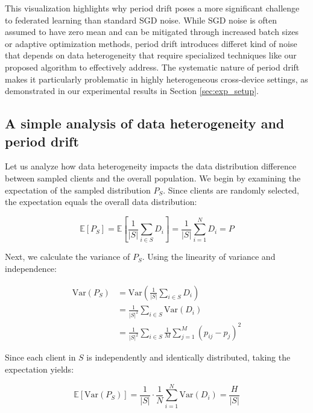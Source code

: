 This visualization highlights why period drift poses a more significant challenge to federated learning than standard SGD noise. While SGD noise is often assumed to have zero mean and can be mitigated through increased batch sizes or adaptive optimization methods, period drift introduces differet kind of noise that depends on data heterogeneity that require specialized techniques like our proposed \fedeve algorithm to effectively address. The systematic nature of period drift makes it particularly problematic in highly heterogeneous cross-device settings, as demonstrated in our experimental results in Section \ref{sec:exp_setup}.

\subsection{A simple analysis of data heterogeneity and period drift}
Let us analyze how data heterogeneity impacts the data distribution difference between sampled clients and the overall population. We begin by examining the expectation of the sampled distribution $P_S$. Since clients are randomly selected, the expectation equals the overall data distribution:

\begin{equation}
    \mathbb{E}[P_S] = \mathbb{E}\left[ \frac{1}{|S|} \sum_{i \in S} D_i \right] = \frac{1}{|S|} \sum_{i=1}^{N} D_i = P
\end{equation}

Next, we calculate the variance of $P_S$. Using the linearity of variance and independence:

\begin{equation}
    \begin{aligned}
        \text{Var}(P_S) &= \text{Var}\left( \frac{1}{|S|} \sum_{i \in S} D_i \right) \\
        &= \frac{1}{|S|^2} \sum_{i \in S} \text{Var}(D_i) \\
        &= \frac{1}{|S|^2} \sum_{i \in S} \frac{1}{M} \sum_{j=1}^{M} (p_{ij} - p_j)^2
    \end{aligned}
\end{equation}

Since each client in $S$ is independently and identically distributed, taking the expectation yields:

\begin{equation}
    \mathbb{E}[\text{Var}(P_S)] = \frac{1}{|S|} \cdot \frac{1}{N} \sum_{i=1}^N \text{Var}(D_i) = \frac{H}{|S|}
\end{equation}

